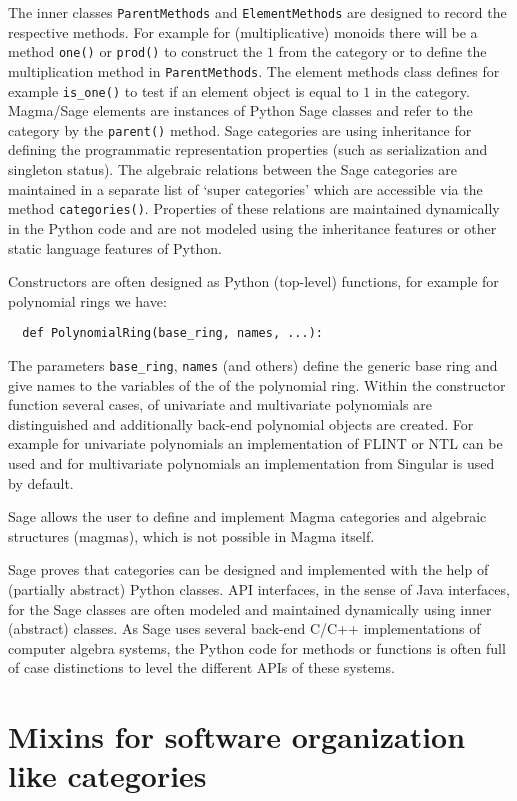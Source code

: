 \documentclass{llncs}
\newcommand{\code}[1]{\texttt{#1}}
\begin{document}
The inner classes \code{ParentMethods} and \code{ElementMethods} are
designed to re\-cord the respective methods. For example for
(multiplicative) monoids there will be a method \code{one()} or
\code{prod()} to construct the $1$ from the category or to define the
multiplication method in \code{ParentMethods}. The element methods
class defines for example \code{is\_one()} to test if an element object
is equal to $1$ in the category.
%
Magma/Sage elements are instances of Python Sage classes and refer to
the category by the \code{parent()} method. Sage categories are using
inheritance for defining the programmatic representation properties
(such as serialization and singleton status).  The algebraic relations
between the Sage categories are maintained in a separate list of
`super categories' which are accessible via the method
\code{categories()}.  Properties of these relations are maintained
dynamically in the Python code and are not modeled using the
inheritance features or other static language features of Python.

Constructors are often designed as Python (top-level) functions, for
example for polynomial rings we have:
\begin{verbatim}
  def PolynomialRing(base_ring, names, ...):
\end{verbatim}
The parameters \code{base\_ring}, \code{names} (and others) define the
generic base ring and give names to the variables of the of the
polynomial ring.  Within the constructor function several cases, of
univariate and multivariate polynomials are distinguished and
additionally back-end polynomial objects are created. For example for
univariate polynomials an implementation of FLINT or NTL can be used
and for multivariate polynomials an implementation from Singular is
used by default.

Sage allows the user to define and implement Magma categories and
algebraic structures (magmas), which is not possible in Magma itself.

Sage proves that categories can be designed and implemented with the
help of (partially abstract) Python classes. API interfaces, in the
sense of Java interfaces, for the Sage classes are often modeled and
maintained dynamically using inner (abstract) classes. As Sage uses
several back-end C/C++ implementations of computer algebra systems, the
Python code for methods or functions is often full of case distinctions
to level the different APIs of these systems.



\section{Mixins for software organization like categories} %
\label{sec:mixin}
\end{document}
